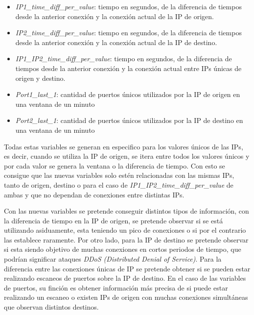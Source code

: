 \begin{itemize}
    \item \textit{IP1\_time\_diff\_per\_value}: tiempo en segundos, de la diferencia de tiempos desde la anterior conexión y la conexión actual de la IP de origen. 
    \item \textit{IP2\_time\_diff\_per\_value}: tiempo en segundos, de la diferencia de tiempos desde la anterior conexión y la conexión actual de la IP de destino.
    \item \textit{IP1\_IP2\_time\_diff\_per\_value}: tiempo en segundos, de la diferencia de tiempos desde la anterior conexión y la conexión actual entre IPs únicas de origen y destino.
    \item \textit{Port1\_last\_1}: cantidad de puertos únicos utilizados por la IP de origen en una ventana de un minuto
    \item \textit{Port2\_last\_1}: cantidad de puertos únicos utilizados por la IP de destino en una ventana de un minuto
\end{itemize}

Todas estas variables se generan en especifico para los valores únicos de las IPs, es decir, cuando se utiliza la IP de origen, se itera entre todos los valores únicos y por cada valor se genera la ventana o la diferencia de tiempo. Con esto se consigue que las nuevas variables solo estén relacionadas con las mismas IPs, tanto de origen, destino o para el caso de \textit{IP1\_IP2\_time\_diff\_per\_value} de ambas y que no dependan de conexiones entre distintas IPs.

Con las nuevas variables se pretende conseguir distintos tipos de información, con la diferencia de tiempo en la IP de origen, se pretende observar si se está utilizando asiduamente, esta teniendo un pico de conexiones o si por el contrario las establece raramente. Por otro lado, para la IP de destino se pretende observar si esta siendo objetivo de muchas conexiones en cortos periodos de tiempo, que podrían significar ataques \textit{DDoS (Distributed Denial of Service)}. Para la diferencia entre las conexiones únicas de IP se pretende obtener si se pueden estar realizando escaneos de puertos sobre la IP de destino. En el caso de las variables de puertos, su finción es obtener información más precisa de si puede estar realizando un escaneo o existen IPs de origen con muchas conexiones simultáneas que observan distintos destinos.


